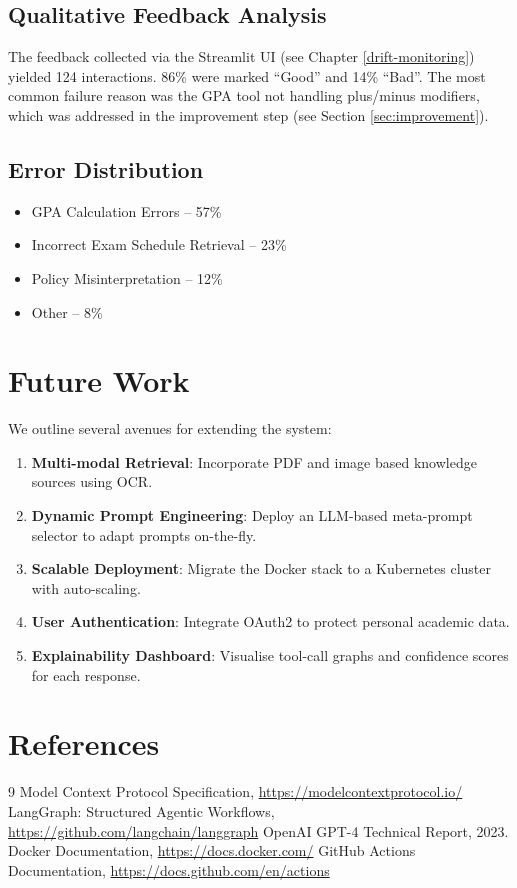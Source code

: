 \documentclass[12pt, a4paper]{report}
\begin{document}
\subsection{Qualitative Feedback Analysis}
The feedback collected via the Streamlit UI (see Chapter \ref{drift-monitoring}) yielded 124 interactions. 86\% were marked ``Good'' and 14\% ``Bad''. The most common failure reason was the GPA tool not handling plus/minus modifiers, which was addressed in the improvement step (see Section \ref{sec:improvement}).

\subsection{Error Distribution}
\begin{itemize}
  \item GPA Calculation Errors -- 57\%
  \item Incorrect Exam Schedule Retrieval -- 23\%
  \item Policy Misinterpretation -- 12\%
  \item Other -- 8\%
\end{itemize}

\section{Future Work}\label{sec:future}
We outline several avenues for extending the system:
\begin{enumerate}
  \item \textbf{Multi-modal Retrieval}: Incorporate PDF and image based knowledge sources using OCR.
  \item \textbf{Dynamic Prompt Engineering}: Deploy an LLM-based meta-prompt selector to adapt prompts on-the-fly.
  \item \textbf{Scalable Deployment}: Migrate the Docker stack to a Kubernetes cluster with auto-scaling.
  \item \textbf{User Authentication}: Integrate OAuth2 to protect personal academic data.
  \item \textbf{Explainability Dashboard}: Visualise tool-call graphs and confidence scores for each response.
\end{enumerate}

\section{References}\label{sec:references}
\begin{thebibliography}{9}
   Model Context Protocol Specification, \url{https://modelcontextprotocol.io/}
   LangGraph: Structured Agentic Workflows, \url{https://github.com/langchain/langgraph}
   OpenAI GPT-4 Technical Report, 2023.
   Docker Documentation, \url{https://docs.docker.com/}
   GitHub Actions Documentation, \url{https://docs.github.com/en/actions}
\end{thebibliography}
\end{document}
